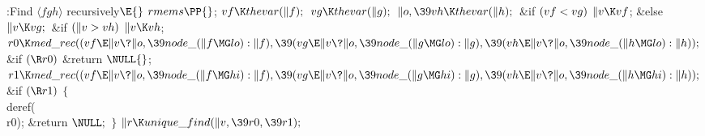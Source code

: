 \B{}:Find $\langle fgh\rangle$ recursively\X${}\E{}$\6
$\\{rmems}\PP{}$;\6
${}\\{vf}\K\\{thevar}(\|f);{}$\6
${}\\{vg}\K\\{thevar}(\|g);{}$\6
${}\|o,\39\\{vh}\K\\{thevar}(\|h);{}$\6
\&{if} ${}(\\{vf}<\\{vg}){}$\1\5
${}\|v\K\\{vf}{}$;\5
\2\&{else}\1\5
${}\|v\K\\{vg};{}$\2\6
\&{if} ${}(\|v>\\{vh}){}$\1\5
${}\|v\K\\{vh}{}$;\2\6
${}\\{r0}\K\\{med\_rec}((\\{vf}\E\|v\?\|o,\39\\{node\_}(\|f\MG\\{lo}):\|f),\39(%
\\{vg}\E\|v\?\|o,\39\\{node\_}(\|g\MG\\{lo}):\|g),\39(\\{vh}\E\|v\?\|o,\39%
\\{node\_}(\|h\MG\\{lo}):\|h));{}$\6
\&{if} ${}(\R\\{r0}){}$\1\5
\&{return} ${}\NULL{}$;\2\6
${}\\{r1}\K\\{med\_rec}((\\{vf}\E\|v\?\|o,\39\\{node\_}(\|f\MG\\{hi}):\|f),\39(%
\\{vg}\E\|v\?\|o,\39\\{node\_}(\|g\MG\\{hi}):\|g),\39(\\{vh}\E\|v\?\|o,\39%
\\{node\_}(\|h\MG\\{hi}):\|h));{}$\6
\&{if} ${}(\R\\{r1}){}$\5
${}\{{}$\1\6
\\{deref}(\\{r0});\6
\&{return} ${}\NULL;{}$\6
\4${}\}{}$\2\6
${}\|r\K\\{unique\_find}(\|v,\39\\{r0},\39\\{r1});{}$\6
